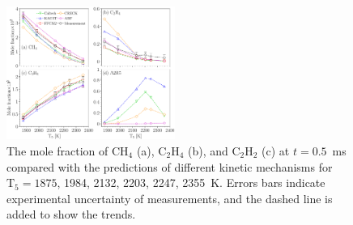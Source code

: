\begin{figure}[!t]
	\centering
	\includegraphics[width=0.49\textwidth]{Figures/CH4_C2H4_C2H2_A2R5_allconds_sampled.pdf}
	\caption{The mole fraction of $\mathrm{CH_4}$ (a), $\mathrm{C_2H_4}$ (b), and $\mathrm{C_2H_2}$ (c) at $t=0.5$~ms compared with the predictions of different kinetic mechanisms for $\mathrm{T_5}=1875$, 1984, 2132, 2203, 2247, 2355~K. Errors bars indicate experimental uncertainty of measurements, and the dashed line is added to show the trends.}
	\label{fig:interm_sampled_comp} 
\end{figure}



